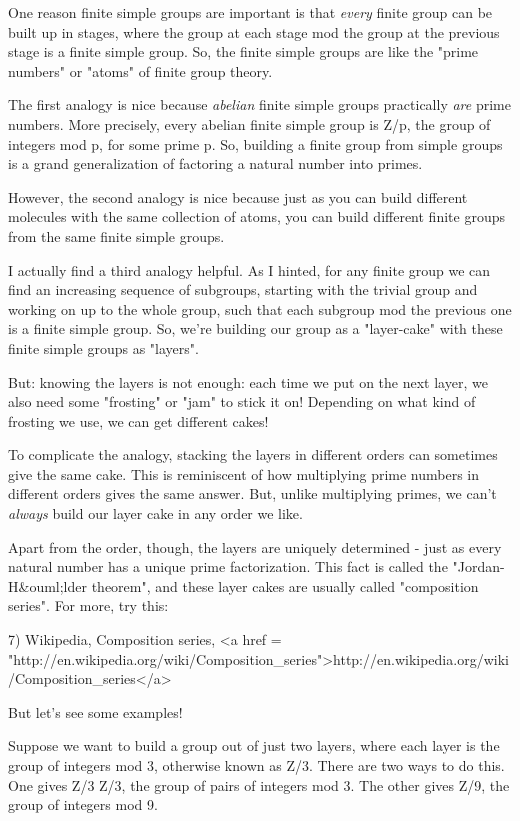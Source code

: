 One reason finite simple groups are important is that \emph{every}
finite group can be built up in stages, where the group at each 
stage mod the group at the previous stage is a finite simple
group.   So, the finite simple groups are like the "prime 
numbers" or "atoms" of finite group theory.  

The first analogy is nice because \emph{abelian} finite simple groups 
practically \emph{are} prime numbers.  More precisely, every abelian 
finite simple group is Z/p, the group of integers mod p, for some 
prime p.  So, building a finite group from simple groups is a grand 
generalization of factoring a natural number into primes.

However, the second analogy is nice because just as you can build 
different molecules with the same collection of atoms, you can 
build different finite groups from the same finite simple groups.

I actually find a third analogy helpful.  As I hinted, for any finite 
group we can find an increasing sequence of subgroups, starting with the 
trivial group and working on up to the whole group, such that each subgroup 
mod the previous one is a finite simple group.  So, we're building our
group as a "layer-cake" with these finite simple groups as
"layers".

But: knowing the layers is not enough: each time we put on the next
layer, we also need some "frosting" or "jam" to
stick it on!  Depending on what kind of frosting we use, we can get
different cakes!

To complicate the analogy, stacking the layers in different 
orders can sometimes give the same cake.  This is reminiscent
of how multiplying prime numbers in different orders gives the 
same answer.  But, unlike multiplying primes, we can't \emph{always}
build our layer cake in any order we like. 

Apart from the order, though, the layers are uniquely determined -
just as every natural number has a unique prime factorization.  This
fact is called the "Jordan-H&ouml;lder theorem", and these
layer cakes are usually called "composition series".  For
more, try this:

7) Wikipedia, Composition series,
<a href = "http://en.wikipedia.org/wiki/Composition_series">http://en.wikipedia.org/wiki/Composition_series</a>

But let's see some examples! 

Suppose we want to build a group out of just two layers, where 
each layer is the group of integers mod 3, otherwise known as Z/3.  
There are two ways to do this.  One gives Z/3 \oplus  Z/3, the group
of pairs of integers mod 3.  The other gives Z/9, the group of
integers mod 9.  

